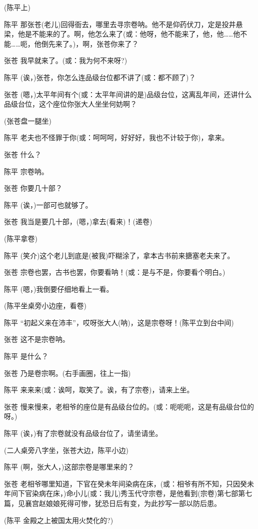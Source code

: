 (陈平上)

陈平
那张苍(老儿)回得衙去，哪里去寻宗卷呐。他不是仰药伏刀，定是投井悬梁，他是不能来的了。啊，他怎么来了(或：他呀，他不能来了，他，他\ldots{}\ldots{}他不能\ldots{}\ldots{}呃，他倒先来了。)，啊，张苍你来了？

张苍 我早就来了。(或：我为何不来呀?)

陈平 (诶，)张苍，你怎么连品级台位都不讲了(或：都不顾了)？

张苍
(嗯，)太平年间有个(或：太平年间讲的是)品级台位，这离乱年间，还讲什么品级台位，这个座位你张大人坐坐何妨啊？

(张苍盘一腿坐)

陈平 老夫也不怪罪于你(或：呵呵呵，好好好，我也不计较于你)，拿来。

张苍 什么？

陈平 宗卷呐。

张苍 你要几十部？

陈平 (诶，)一部可也就够了。

张苍 我当是要几十部，(嗯，)拿去(看来)！(递卷)

(陈平拿卷)

陈平 (笑介)这个老儿到底是(被我)吓糊涂了，拿本古书前来搪塞老夫来了。

张苍 宗卷也罢，古书也罢，你要看呐！(或：是与不是，你要看个明白。)

陈平 (嗯，)我倒要仔细地看上一看。

(陈平坐桌旁小边座，看卷)

陈平 ``初起义来在沛丰''，哎呀张大人(呐)，这是宗卷呀！(陈平立到台中间)

张苍 这不是宗卷呐。

陈平 是什么？

张苍 乃是卷宗啊。(右手画圈，往上一指)

陈平 来来来(或：诶呵，取笑了。诶，有了宗卷)，请来上坐。

张苍
慢来慢来，老相爷的座位是有品级台位的。(或：呃呃呃，这是有品级台位的呀。)

陈平 (诶，)有了宗卷就没有品级台位了，请坐请坐。

(二人桌旁八字坐，张苍大边，陈平小边)

陈平 (啊，张大人，)这部宗卷是哪里来的？

张苍
老相爷哪里知道，下官在癸未年间染病在床，(或：相爷有所不知，只因癸未年间下官染病在床，)命小儿(或：我儿)秀玉代守宗卷，是他看到(宗卷)第七部第七篇，见襄宫赵娘娘死得可惨，犹恐日后有变，为此抄写一部以防后患。

(陈平 金殿之上被国太用火焚化的?)

